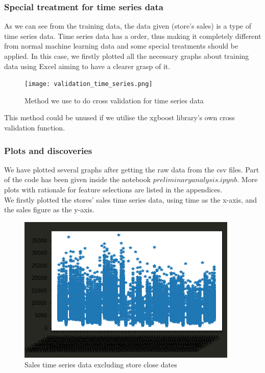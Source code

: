 \documentclass{article}
\begin{document}
\subsubsection{Special treatment for time series data}
As we can see from the training data, the data given (store's sales) is a type of time series data. Time series data has a order, thus making it completely different from normal machine learning data and some special treatments should be applied. In this case, we firstly plotted all the necessary graphs about training data using  Excel aiming to have a clearer grasp of it.\\

\begin{figure}[h]
	\centering
	\texttt{[image: validation\_time\_series.png]}
	\caption{Method we use to do cross validation for time series data}
\end{figure}

This method could be unused if we utilise the xgboost library's own cross validation function.


\subsubsection{Plots and discoveries}
We have plotted several graphs after getting the raw data from the csv files. Part of the code has been given inside the notebook $preliminary analysis.ipynb$. More plots with rationale for feature selections are listed in the appendices.\\
We firstly plotted the stores' sales time series data, using time as the x-axis, and the sales figure as the y-axis.\\
\begin{figure}[h]
	\centering
	\includegraphics[scale=0.35]{sales_time_series.png}
	\caption{Sales time series data excluding store close dates}
\end{figure}
\end{document}
